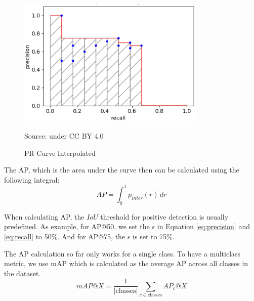   \begin{figure}[p]
        \centering
        \includegraphics[width=0.8\textwidth]{figures/pr-interp.png}
        \vspace{-1ex}
        \caption*{Source: \textcite{map-hui} under CC BY 4.0}
        \vspace{-1ex}
        \caption{PR Curve Interpolated}
        \label{fig:pr-interp}
  \end{figure}
  The AP, which is the area under the curve then can be calculated using the following integral:
  \begin{equation}
    AP = \int_{0}^{1} p_{inter}(r) \, dr
  \end{equation}

  When calculating AP, the $IoU$ threshold for positive detection is usually predefined. As example,
  for AP@50, we set the $\epsilon$ in Equation \ref{eq:precision} and \ref{eq:recall} to 50\%. And for 
  AP@75, the $\epsilon$ is set to 75\%.

  The AP calculation so far only works for a single class. To have a multiclass metric, we use mAP
  which is calculated as the average AP across all classes in the dataset.
  \begin{equation}
    mAP@X = \frac{1}{|\text{classes}|} \sum_{c\in \text{classes}} AP_c@X
  \end{equation}


